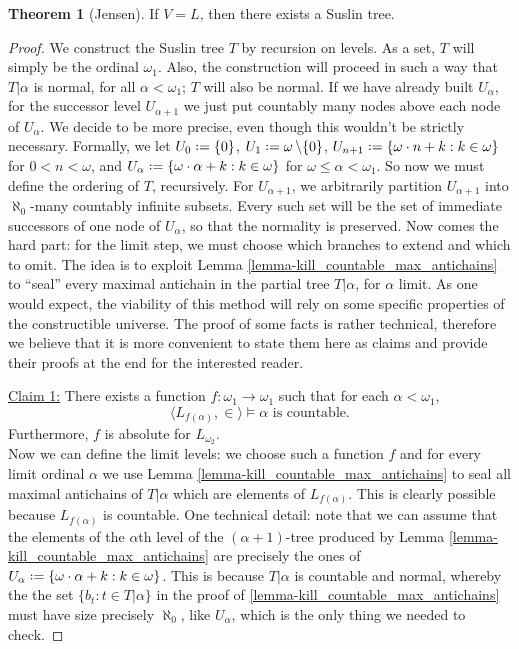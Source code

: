 \documentclass[12pt,a4paper]{report}
\theoremstyle{definition}
\newtheorem{theorem}{Theorem}[chapter] %
\theoremstyle{num.custom-title}
\newenvironment{claim}[1]{\par\noindent\underline{Claim#1:}\space}{} %
\DeclareMathOperator{\sm}{\setminus}
\newcommand*{\defeq}{\mathrel{\rlap{%
                     \raisebox{0.3ex}{$\cdot$}}%
                     \raisebox{-0.3ex}{$\cdot$}}%
                     =}
\begin{document}
\begin{theorem}[Jensen]\label{thm-suslin_tree_in_L}
If $V=L$, then there exists a Suslin tree.
\begin{proof}
We construct the Suslin tree $T$ by recursion on levels. As a set, $T$ will simply be the ordinal $\omega_1$. Also, the construction will proceed in such a way that $T|\alpha$ is normal, for all $\alpha < \omega_1$; $T$ will also be normal. If we have already built $U_\alpha$, for the successor level $U_{\alpha+1}$ we just put countably many nodes above each node of $U_\alpha$. We decide to be more precise, even though this wouldn't be strictly necessary. Formally, we let $U_0 \defeq \{0\}$, $U_1 \defeq \omega \sm \{0\}$, $U_{n+1} \defeq \{ \omega \cdot n + k : k \in \omega \}$ for $0<n<\omega$, and $U_\alpha \defeq \{ \omega \cdot \alpha + k : k \in \omega \}$ for $\omega \leq \alpha < \omega_1$. So now we must define the ordering of $T$, recursively. For $U_{\alpha+1}$, we arbitrarily partition $U_{\alpha+1}$ into $\aleph_0$-many countably infinite subsets. Every such set will be the set of immediate successors of one node of $U_\alpha$, so that the normality is preserved. Now comes the hard part: for the limit step, we must choose which branches to extend and which to omit. The idea is to exploit Lemma \ref{lemma-kill_countable_max_antichains} to ``seal'' every maximal antichain in the partial tree $T|\alpha$, for $\alpha$ limit. As one would expect, the viability of this method will rely on some specific properties of the constructible universe. The proof of some facts is rather technical, therefore we believe that it is more convenient to state them here as claims and provide their proofs at the end for the interested reader.\\
\begin{claim}{ 1}
There exists a function $f \colon \omega_1 \to \omega_1$ such that for each $\alpha < \omega_1$,
\[
\langle L_{f(\alpha)}, \in \rangle \models \alpha \text{ is countable}.
\]
Furthermore, $f$ is absolute for $L_{\omega_2}$.
\end{claim}\\

Now we can define the limit levels: we choose such a function $f$ and for every limit ordinal $\alpha$ we use Lemma \ref{lemma-kill_countable_max_antichains} to seal all maximal antichains of $T|\alpha$ which are elements of $L_{f(\alpha)}$. This is clearly possible because $L_{f(\alpha)}$ is countable. One technical detail: note that we can assume that the elements of the $\alpha$th level of the $(\alpha+1)$-tree produced by Lemma \ref{lemma-kill_countable_max_antichains} are precisely the ones of $U_\alpha \defeq \{ \omega \cdot \alpha + k : k \in \omega \}$. This is because $T|\alpha$ is countable and normal, whereby the the set $\{b_t : t \in T|\alpha\}$ in the proof of \ref{lemma-kill_countable_max_antichains} must have size precisely $\aleph_0$, like $U_\alpha$, which is the only thing we needed to check.


\end{proof}
\end{theorem}
\end{document}

